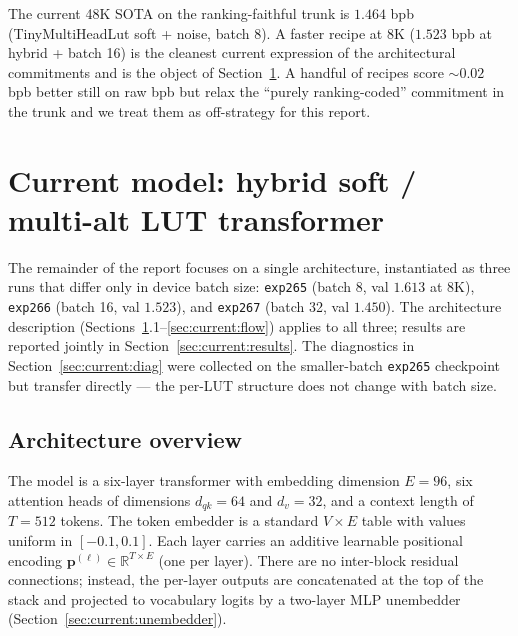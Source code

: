 \documentclass[11pt]{article}
\begin{document}
The current 48K SOTA on the ranking-faithful trunk is $1.464$ bpb (TinyMultiHeadLut soft + noise, batch 8).
A faster recipe at 8K ($1.523$ bpb at hybrid + batch 16) is the cleanest current expression of the architectural commitments and is the object of Section~\ref{sec:current}.
A handful of recipes score $\sim$$0.02$ bpb better still on raw bpb but relax the ``purely ranking-coded'' commitment in the trunk and we treat them as off-strategy for this report.



\section{Current model: hybrid soft / multi-alt LUT transformer}
\label{sec:current}

The remainder of the report focuses on a single architecture, instantiated as three runs that differ only in device batch size: \texttt{exp265} (batch 8, val $1.613$ at 8K), \texttt{exp266} (batch 16, val $1.523$), and \texttt{exp267} (batch 32, val $\mathbf{1.450}$).
The architecture description (Sections~\ref{sec:current}.1--\ref{sec:current:flow}) applies to all three; results are reported jointly in Section~\ref{sec:current:results}.
The diagnostics in Section~\ref{sec:current:diag} were collected on the smaller-batch \texttt{exp265} checkpoint but transfer directly --- the per-LUT structure does not change with batch size.

\subsection{Architecture overview}

The model is a six-layer transformer with embedding dimension $E = 96$, six attention heads of dimensions $d_{qk} = 64$ and $d_v = 32$, and a context length of $T = 512$ tokens.
The token embedder is a standard $V \times E$ table with values uniform in $[-0.1, 0.1]$.
Each layer carries an additive learnable positional encoding $\mathbf{p}^{(\ell)} \in \mathbb{R}^{T \times E}$ (one per layer).
There are no inter-block residual connections; instead, the per-layer outputs are concatenated at the top of the stack and projected to vocabulary logits by a two-layer MLP unembedder (Section~\ref{sec:current:unembedder}).
\end{document}
